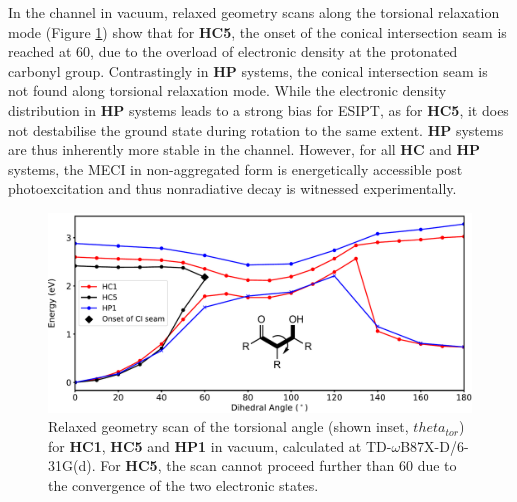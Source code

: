 In the \Kstar{} channel in vacuum, relaxed geometry scans along the torsional relaxation mode (Figure \ref{figure: dihedral_scans_vac}) show that for \textbf{HC5}, the onset of the conical intersection seam is reached at 60\degree, due to the overload of electronic density at the protonated carbonyl group. Contrastingly in \textbf{HP} systems, the conical intersection seam is not found along torsional relaxation mode. While the electronic density distribution in \textbf{HP} systems leads to a strong bias for ESIPT, as for \textbf{HC5}, it does not destabilise the ground state during rotation to the same extent. \textbf{HP} systems are thus inherently more stable in the \Kstar{} channel. However, for all \textbf{HC} and \textbf{HP} systems, the MECI in non-aggregated form is energetically accessible post photoexcitation and thus nonradiative decay is witnessed experimentally.

\begin{figure}[t]
\centering
  \includegraphics[width=0.8\linewidth]{5ConnectingCrystalStructure/dihedral_scans_vac}
  \caption[Relaxed geometry scan of the torsional angle]{Relaxed geometry scan of the torsional angle (shown inset, $theta_{tor}$)  for \textbf{HC1}, \textbf{HC5} and \textbf{HP1} in vacuum, calculated at TD-$\omega$B87X-D/6-31G(d). For \textbf{HC5}, the scan cannot proceed further than 60\degree{} due to the convergence of the two electronic states.}
  \label{figure: dihedral_scans_vac}
\end{figure}

